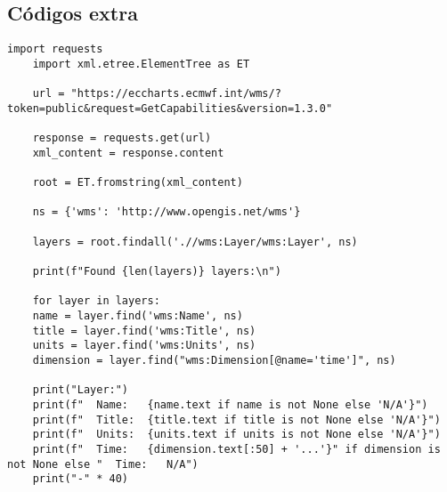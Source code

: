 \pagebreak
\cleardoublepage
\begin{appendices}
\chapter{Códigos extra}
\label{anexo1}
\appendix


\begin{lstlisting}[caption={Python script to parse CAMS WMS GetCapabilities response}, label={lst:getcapabilities}]
	import requests
	import xml.etree.ElementTree as ET
	
	url = "https://eccharts.ecmwf.int/wms/?token=public&request=GetCapabilities&version=1.3.0"
	
	response = requests.get(url)
	xml_content = response.content
	
	root = ET.fromstring(xml_content)
	
	ns = {'wms': 'http://www.opengis.net/wms'}
	
	layers = root.findall('.//wms:Layer/wms:Layer', ns)
	
	print(f"Found {len(layers)} layers:\n")
	
	for layer in layers:
	name = layer.find('wms:Name', ns)
	title = layer.find('wms:Title', ns)
	units = layer.find('wms:Units', ns)
	dimension = layer.find("wms:Dimension[@name='time']", ns)
	
	print("Layer:")
	print(f"  Name:   {name.text if name is not None else 'N/A'}")
	print(f"  Title:  {title.text if title is not None else 'N/A'}")
	print(f"  Units:  {units.text if units is not None else 'N/A'}")
	print(f"  Time:   {dimension.text[:50] + '...'}" if dimension is not None else "  Time:   N/A")
	print("-" * 40)
\end{lstlisting}

\end{appendices}